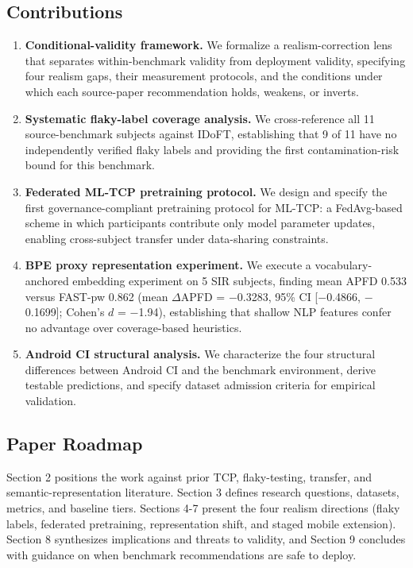 \documentclass[conference]{IEEEtran}
\begin{document}
\subsection{Contributions}

\begin{enumerate}[leftmargin=*]
\item \textbf{Conditional-validity framework.} We formalize a realism-correction lens that separates within-benchmark validity from deployment validity, specifying four realism gaps, their measurement protocols, and the conditions under which each source-paper recommendation holds, weakens, or inverts.
\item \textbf{Systematic flaky-label coverage analysis.} We cross-reference all 11 source-benchmark subjects against IDoFT, establishing that 9 of 11 have no independently verified flaky labels and providing the first contamination-risk bound for this benchmark.
\item \textbf{Federated ML-TCP pretraining protocol.} We design and specify the first governance-compliant pretraining protocol for ML-TCP: a FedAvg-based scheme in which participants contribute only model parameter updates, enabling cross-subject transfer under data-sharing constraints.
\item \textbf{BPE proxy representation experiment.} We execute a vocabulary-anchored embedding experiment on 5 SIR subjects, finding mean APFD 0.533 versus FAST-pw 0.862 (mean $\Delta$APFD = $-$0.3283, 95\% CI [$-$0.4866, $-$0.1699]; Cohen's $d$ = $-$1.94), establishing that shallow NLP features confer no advantage over coverage-based heuristics.
\item \textbf{Android CI structural analysis.} We characterize the four structural differences between Android CI and the benchmark environment, derive testable predictions, and specify dataset admission criteria for empirical validation.
\end{enumerate}


\subsection{Paper Roadmap}

Section 2 positions the work against prior TCP, flaky-testing, transfer, and semantic-representation literature. Section 3 defines research questions, datasets, metrics, and baseline tiers. Sections 4-7 present the four realism directions (flaky labels, federated pretraining, representation shift, and staged mobile extension). Section 8 synthesizes implications and threats to validity, and Section 9 concludes with guidance on when benchmark recommendations are safe to deploy.
\end{document}
